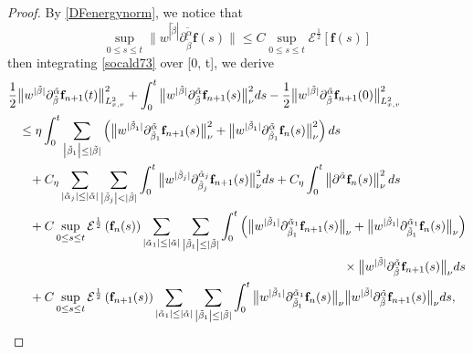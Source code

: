 \documentclass[reqno]{amsart}
\numberwithin{equation}{section}
\numberwithin{equation}{section}
\begin{document}
\begin{proof}
		 By \eqref{DFenergynorm}, we notice that
		\[
		\sup_{0 \le s \le t}\big\|w^{|\tilde{\beta}|}\partial_{\tilde{\beta}}^{\tilde{\alpha}} \mathbf{f}(s)\big\| \le C \sup_{0 \le s \le t}\mathcal{E}^{\frac{1}{2}}[\mathbf{f}(s)]
		\]
		then integrating \eqref{socald73} over [0, t], we derive
			\begin{align}
				&\frac{1}{2}\big\|w^{|\tilde{\beta}|}\partial_{\tilde{\beta}}^{\tilde{\alpha}} \mathbf{f}_{n+1}(t)\big\|^2_{L^{2}_{x,v}}+\int_{0}^{t}\big\|w^{|\tilde{\beta}|}\partial_{\tilde{\beta}}^{\tilde{\alpha}} \mathbf{f}_{n+1}(s)\big\|^2_{\nu} ds -\frac{1}{2}\big\|w^{|\tilde{\beta}|}\partial_{\tilde{\beta}}^{\tilde{\alpha}} \mathbf{f}_{n+1}(0)\big\|^2_{L^{2}_{x,v}} \notag\\
				&\hspace{0.3cm}\leq \eta \int_{0}^{t} \sum_{\big|\tilde{\beta}_{1}\big|\leq|\tilde{\beta}|}\left(\big\|w^{|\tilde{\beta}_1|}\partial_{\tilde{\beta}_1}^{\tilde{\alpha}} \mathbf{f}_{n+1}(s)\big\|^2_{\nu} + \big\|w^{|\tilde{\beta}_1|}\partial_{\tilde{\beta}_1}^{\tilde{\alpha}} \mathbf{f}_{n}(s)\big\|^2_{\nu} \right)ds \notag\\
				&\hspace{0.6cm}+C_{\eta} \sum_{\left|\tilde{\alpha}_{j}\right|\leq|\tilde{\alpha}|}\sum_{\left|\tilde{\beta}_{j}\right|<|\tilde{\beta}|} \int_{0}^{t} \big\|w^{|\tilde{\beta}_j|}\partial_{\tilde{\beta}_j}^{\tilde{\alpha}_j} \mathbf{f}_{n+1}(s)\big\|^2_{\nu}ds+C_{\eta} \int_{0}^{t}\left\|\partial^{\tilde{\alpha}} \mathbf{f}_{n}(s)\right\|_{\nu}^{2} ds \notag\\
				&\hspace{0.6cm}+C \sup _{0 \leq s \leq t} \mathcal{E}^{\frac{1}{2}}\left(\mathbf{f}_{n}(s)\right) \sum_{\left|\tilde{\alpha}_{1}\right|\leq|\tilde{\alpha}|}\sum_{\left|\tilde{\beta}_{1}\right|\leq|\tilde{\beta}|}\int_{0}^{t} \left(\big\|w^{|\tilde{\beta}_1|}\partial_{\tilde{\beta}_1}^{\tilde{\alpha}_1} \mathbf{f}_{n+1}(s)\big\|_{\nu}+\big\|w^{|\tilde{\beta}_1|}\partial_{\tilde{\beta}_1}^{\tilde{\alpha}_1} \mathbf{f}_{n}(s)\big\|_{\nu}\right) \notag\\
				&\hspace{9.5cm}\times\big\|w^{|\tilde{\beta}|}\partial_{\tilde{\beta}}^{\tilde{\alpha}} \mathbf{f}_{n+1}(s)\big\|_{\nu} ds \notag\\
				&\hspace{0.6cm}+C \sup _{0 \leq s \leq t} \mathcal{E}^{\frac{1}{2}}\left(\mathbf{f}_{n+1}(s)\right) \sum_{\left|\tilde{\alpha}_{1}\right|\leq|\tilde{\alpha}|}\sum_{\left|\tilde{\beta}_{1}\right|\leq|\tilde{\beta}|}\int_{0}^{t} \big\|w^{|\tilde{\beta}_1|}\partial_{\tilde{\beta}_1}^{\tilde{\alpha}_1} \mathbf{f}_{n}(s)\big\|_{\nu}\big\|w^{|\tilde{\beta}|}\partial_{\tilde{\beta}}^{\tilde{\alpha}} \mathbf{f}_{n+1}(s)\big\|_{\nu}ds, \label{socaed74}

\end{align}
\end{proof}
\end{document}
